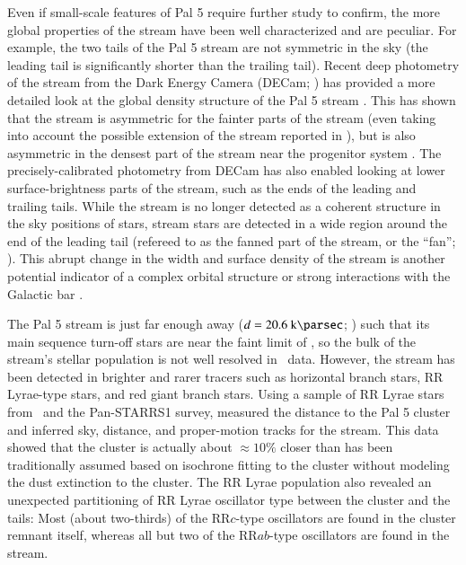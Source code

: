 \documentclass[final,5p,times,twocolumn,authoryear]{elsarticle}
\begin{document}
Even if small-scale features of Pal 5 require further study to confirm, the more global
properties of the stream have been well characterized and are peculiar.
For example, the two tails of the Pal 5 stream are not symmetric in the sky (the leading
tail is significantly shorter than the trailing tail).
Recent deep photometry of the stream from the Dark Energy Camera (DECam;
\citealt{flaugher:2015}) has provided a more detailed look at the global density
structure of the Pal 5 stream \citep{bonaca:2020}.
This has shown that the stream is asymmetric for the fainter parts of the stream (even
taking into account the possible extension of the stream reported in
\citealt{starkman:2020}), but is also asymmetric in the densest part of the stream near
the progenitor system \citep[see Figure 2 of][]{bonaca:2020}.
The precisely-calibrated photometry from DECam has also enabled looking at lower
surface-brightness parts of the stream, such as the ends of the leading and trailing
tails.
While the stream is no longer detected as a coherent structure in the sky positions of
stars, stream stars are detected in a wide region around the end of the leading tail
(refereed to as the fanned part of the stream, or the ``fan''; \citealt{bonaca:2020}).
This abrupt change in the width and surface density of the stream is another potential
indicator of a complex orbital structure \citep{pearson:2015, price-whelan:2016a} or
strong interactions with the Galactic bar \citep{pearson:2017, bonaca:2020}.

The Pal 5 stream is just far enough away ($d = 20.6~\kpc$; \citealt{price-whelan:2019})
such that its main sequence turn-off stars are near the faint limit of \gaia, so the
bulk of the stream's stellar population is not well resolved in \gaia\ data.
However, the stream has been detected in brighter and rarer tracers such as horizontal
branch stars, RR Lyrae-type stars, and red giant branch stars.
Using a sample of RR Lyrae stars from \gaia\ and the Pan-STARRS1 survey,
\citet{price-whelan:2019} measured the distance to the Pal 5 cluster and inferred sky,
distance, and proper-motion tracks for the stream.
This data showed that the cluster is actually about $\approx 10\%$ closer than has been
traditionally assumed based on isochrone fitting to the cluster without modeling the
dust extinction to the cluster.
The RR Lyrae population also revealed an unexpected partitioning of RR Lyrae oscillator
type between the cluster and the tails:
Most (about two-thirds) of the RR$c$-type oscillators are found in the cluster remnant
itself, whereas all but two of the RR$ab$-type oscillators are found in the stream.
\end{document}
